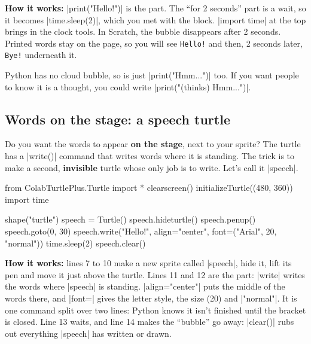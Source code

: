 \textbf{How it works:} \py|print("Hello!")| is the  part. The ``for 2 seconds'' part is a wait, so it becomes \py|time.sleep(2)|, which you met with the  block. \py|import time| at the top brings in the clock tools. In Scratch, the bubble disappears after 2 seconds. Printed words stay on the page, so you will see \texttt{Hello!} and then, 2 seconds later, \texttt{Bye!} underneath it.

\begin{think}
Python has no cloud bubble, so  is just \py|print("Hmm...")| too. If you want people to know it is a thought, you could write \py|print("(thinks) Hmm...")|.
\end{think}

\subsection*{Words on the stage: a speech turtle}

Do you want the words to appear \textbf{on the stage}, next to your sprite? The turtle has a \py|write()| command that writes words where it is standing. The trick is to make a second, \textbf{invisible} turtle whose only job is to write. Let's call it \py|speech|.

\begin{center}
\begin{scratch}
\end{scratch}
\end{center}

\begin{typethis}
from ColabTurtlePlus.Turtle import *
clearscreen()
initializeTurtle((480, 360))
import time

shape("turtle")
speech = Turtle()
speech.hideturtle()
speech.penup()
speech.goto(0, 30)
speech.write("Hello!", align="center",
             font=("Arial", 20, "normal"))
time.sleep(2)
speech.clear()
\end{typethis}

\textbf{How it works:} lines 7 to 10 make a new sprite called \py|speech|, hide it, lift its pen and move it just above the turtle. Lines 11 and 12 are the  part: \py|write| writes the words where \py|speech| is standing. \py|align="center"| puts the middle of the words there, and \py|font=| gives the letter style, the size (20) and \py|"normal"|. It is one command split over two lines: Python knows it isn't finished until the bracket is closed. Line 13 waits, and line 14 makes the ``bubble'' go away: \py|clear()| rubs out everything \py|speech| has written or drawn.

